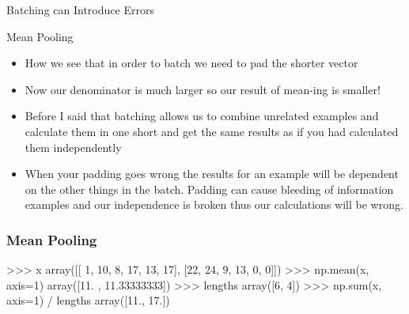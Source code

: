\documentclass{beamer}
\begin{document}
\begin{section}{Batching can Introduce Errors}
\begin{subsection}{Mean Pooling}
\begin{frame}
{\begin{itemize}
                    \item<3-> How we see that in order to batch we need to pad the shorter vector
                    \item<3-> Now our denominator is much larger so our result of mean-ing is smaller!
                    \item<3-> Before I said that batching allows us to combine unrelated examples and calculate them in
                        one short and get the same results as if you had calculated them independently
                    \item<3-> When your padding goes wrong the results for an example will be dependent on the other
                        things in the batch. Padding can cause bleeding of information examples and our
                        independence is broken thus our calculations will be wrong.
                \end{itemize}
            }
        \end{frame}

\begin{frame}[fragile]
    \frametitle{Mean Pooling}

    \begin{pythoncode}
            >>> x
            array([[ 1, 10,  8, 17, 13, 17],
                   [22, 24,  9, 13,  0,  0]])
            >>> np.mean(x, axis=1)
            array([11.        , 11.33333333])
            >>> lengths
            array([6, 4])
            >>> np.sum(x, axis=1) / lengths
            array([11., 17.])
    \end{pythoncode}


\end{frame}
\end{subsection}
\end{section}
\end{document}
